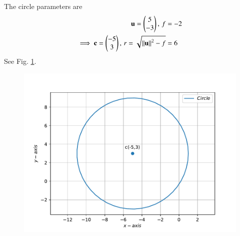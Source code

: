The circle parameters are
\begin{align}
 \mathbf{u}=\begin{pmatrix}5\\ -3\end{pmatrix},\,
 f&=-2\\
\implies \mathbf{c}=\begin{pmatrix}-5 \\ 3\end{pmatrix},\,
	r=\sqrt{\left\lVert\mathbf{u}\right\rVert^2-f}
&= 6
\end{align}
See Fig. 
\ref{fig:chapters/11/11/1/6/Fig1}.
\begin{figure}[!h]
	\begin{center} 
	   \includegraphics[width=\columnwidth]{chapters/11/11/1/6/figs/fig.pdf}
	\end{center}
\caption{}
\label{fig:chapters/11/11/1/6/Fig1}
\end{figure}

